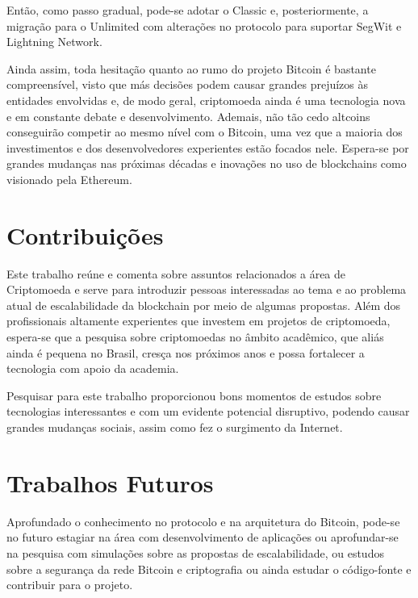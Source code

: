 Então, como passo gradual, pode-se adotar o Classic e, posteriormente, a migração para o Unlimited com alterações no protocolo para suportar SegWit e Lightning Network.

Ainda assim, toda hesitação quanto ao rumo do projeto Bitcoin é bastante compreensível, visto que más decisões podem causar grandes prejuízos às entidades envolvidas e, de modo geral, criptomoeda ainda é uma tecnologia nova e em constante debate e desenvolvimento. Ademais, não tão cedo altcoins conseguirão competir ao mesmo nível com o Bitcoin, uma vez que a maioria dos investimentos e dos desenvolvedores experientes estão focados nele. Espera-se por grandes mudanças nas próximas décadas e inovações no uso de blockchains como visionado pela Ethereum.

\section{Contribuições}

Este trabalho reúne e comenta sobre assuntos relacionados a área de Criptomoeda e serve para introduzir pessoas interessadas ao tema e ao problema atual de escalabilidade da blockchain por meio de algumas propostas. Além dos profissionais altamente experientes que investem em projetos de criptomoeda, espera-se que a pesquisa sobre criptomoedas no âmbito acadêmico, que aliás ainda é pequena no Brasil, cresça nos próximos anos e possa fortalecer a tecnologia com apoio da academia.

Pesquisar para este trabalho proporcionou bons momentos de estudos sobre tecnologias interessantes e com um evidente potencial disruptivo, podendo causar grandes mudanças sociais, assim como fez o surgimento da Internet.

\section{Trabalhos Futuros}

Aprofundado o conhecimento no protocolo e na arquitetura do Bitcoin, pode-se no futuro estagiar na área com desenvolvimento de aplicações ou aprofundar-se na pesquisa com simulações sobre as propostas de escalabilidade, ou estudos sobre a segurança da rede Bitcoin e criptografia ou ainda estudar o código-fonte e contribuir para o projeto.
